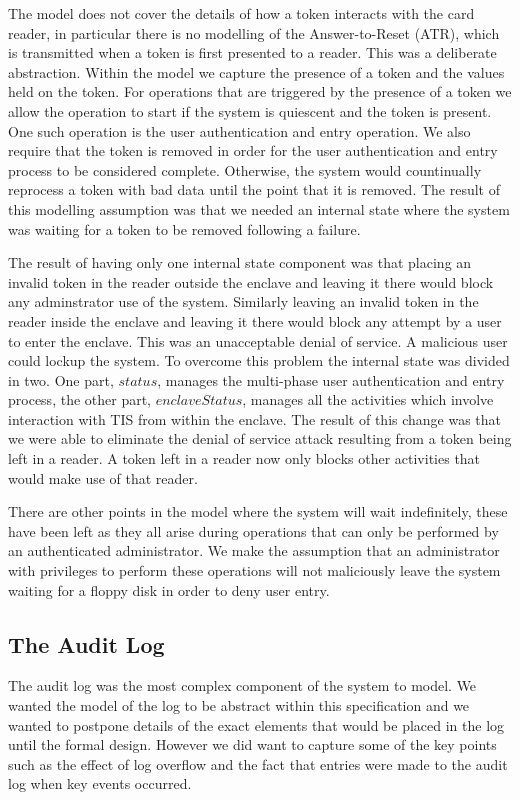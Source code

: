 The model does not cover the details of how a token interacts with the
card reader, in particular there is no modelling of the
Answer-to-Reset (ATR), which is
transmitted when a token is first presented to a reader. This was a
deliberate abstraction. Within the model we capture the presence of a
token and the values held on the token. For operations that are
triggered by the presence of a token we allow the operation to start
if the system is quiescent and the token is present. One such
operation is the user authentication and entry operation. We
also require that the token is removed in order for the user
authentication and entry process to be considered complete. 
Otherwise, the system would countinually reprocess 
a token with bad data until the point that it is removed. 
The result of this modelling assumption was that we needed an
internal state where the system was waiting for a token to be removed
following a failure. 

The result of having only one internal state component was that
placing an invalid token in the reader outside the enclave and leaving
it there would block any adminstrator use of the system. Similarly
leaving an invalid token in the reader inside the enclave and leaving
it there would block any attempt by a user to enter the enclave. This
was an unacceptable denial of service. A malicious user could lockup the
system. To overcome this problem the internal state was divided in
two. One part, $status$, manages the multi-phase user authentication and
entry process, the other part, $enclaveStatus$, manages all the
activities which involve interaction with TIS from within the enclave.
The result of this change was that we were able to eliminate the
denial of service attack resulting from a token being left in a
reader. A token left in a reader now only blocks other activities that
would make use of that reader.

There are other points in the model where the system will wait
indefinitely, these have been left as they all arise during operations
that can only be performed by an authenticated administrator. We make
the assumption that an administrator with privileges to perform these
operations will not maliciously leave the system waiting for a floppy
disk in order to deny user entry. 

\subsection{The Audit Log}
The audit log was the most complex component of the system to
model. We wanted the model of the log to be abstract within this
specification and we wanted to postpone details of the exact elements
that would be placed in the log until the formal design. However we did
want to capture some of the key points such as the effect of log
overflow and the fact that entries were made to the audit log when key
events occurred.

